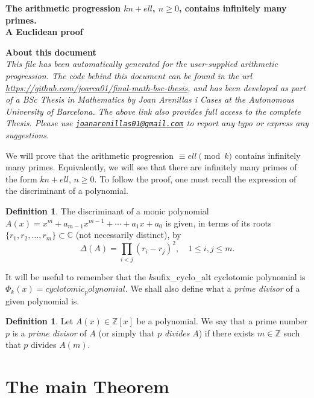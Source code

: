 \documentclass[a4paper, 12pt]{article}
\theoremstyle{definition}
\newtheorem{definition}[theorem]{Definition}
\newcommand{\Z}{\ensuremath{\mathbb{Z}}}
\newcommand{\C}{\ensuremath{\mathbb{C}}}
\renewcommand\title{\textbf{The arithmetic progression ${k}n+{ell}$, $n\geqslant0$, contains infinitely many primes.\\ A Euclidean proof}}
\begin{document}
\thispagestyle{plain}
\sloppy
\begin{center}
{\huge \bfseries \title\par}
\vspace{1cm}
\end{center}

\begin{mybox}
{\Large \textbf{About this document}}
\vspace{0.3cm}\\
\textit{This file has been automatically generated for the user-supplied arithmetic progression. The code behind this document can be found in the url \url{https://github.com/joarca01/final-math-bsc-thesis}, and has been developed as part of a BSc Thesis in Mathematics by Joan Arenillas i Cases at the Autonomous University of Barcelona. The above link also provides full access to the complete Thesis. Please use \href{mailto:joanarenillas01@gmail.com}{\nolinkurl{joanarenillas01@gmail.com}} to report any typo or express any suggestions.}
\end{mybox}
\vspace{0.5cm}

We will prove that the arithmetic progression $\equiv {ell} \pmod{{k}}$ contains infinitely many primes. Equivalently, we will see that there are infinitely many primes of the form ${k}n+{ell}$, $n\geqslant0$. To follow the proof, one must recall the expression of the discriminant of a polynomial. 
\begin{definition}
The discriminant of a monic polynomial $A(x)=x^m+a_{m-1}x^{m-1}+\cdots+a_1x+a_0$ is given, in terms of its roots $\{r_1,r_2,\dots,r_m\}\subset\C$ (not necessarily distinct), by
\begin{equation}\label{eq:discrim}
	\Delta(A)=\prod_{i<j}(r_i-r_j)^2, \quad 1\leqslant i,j\leqslant m.
\end{equation}
\end{definition}
It will be useful to remember that the ${k}${sufix_cyclo_alt} cyclotomic polynomial is $\Phi_{{k}}(x)={cyclotomic_polynomial}$. We shall also define what a \emph{prime divisor} of a given polynomial is.
\begin{definition}
Let $A(x)\in\Z[x]$ be a polynomial. We say that a prime number $p$ is a \emph{prime divisor} of $A$ (or simply that $p$ \emph{divides} $A$) if there exists $m\in\Z$ such that $p$ divides $A(m)$.
\end{definition}

\section{The main Theorem}\label{sec:mainTh}
\end{document}
